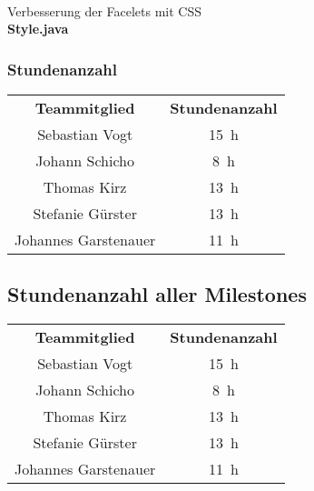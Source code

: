 \begin{landscape}
{{        \\Verbesserung der Facelets mit CSS\\\textbf{Style.java}}
    }

    \subsubsection{Stundenanzahl}
    \begin{center}
        \begin{tabular}{ c c }
            \textbf{Teammitglied} & \textbf{Stundenanzahl} \\
            Sebastian Vogt        & 15~h                   \\
            Johann Schicho        & 8~h                    \\
            Thomas Kirz           & 13~h                   \\
            Stefanie Gürster      & 13~h                   \\
            Johannes Garstenauer  & 11~h
        \end{tabular}
    \end{center}

    \subsection{Stundenanzahl aller Milestones}
    \begin{center}
        \begin{tabular}{ c c }
            \textbf{Teammitglied} & \textbf{Stundenanzahl} \\
            Sebastian Vogt        & 15~h                   \\
            Johann Schicho        & 8~h                    \\
            Thomas Kirz           & 13~h                   \\
            Stefanie Gürster      & 13~h                   \\
            Johannes Garstenauer  & 11~h
        \end{tabular}
    \end{center}
\end{landscape}